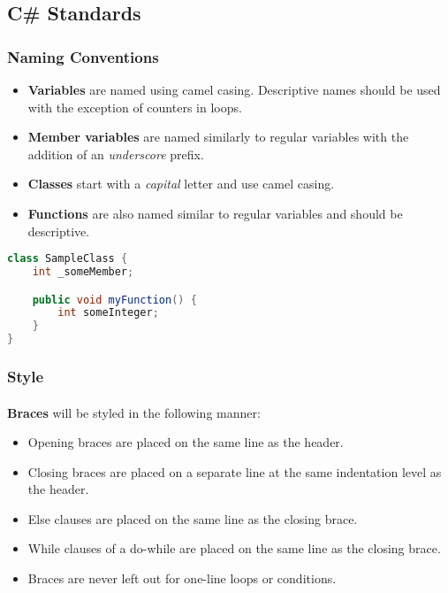 \documentclass{article}
\begin{document}
    \subsection{C\# Standards}
    \label{sec:cs}

    \subsubsection{Naming Conventions}
    \label{sec:cs-nc}

    \begin{itemize}
        \item \textbf{Variables} are named using camel casing. Descriptive names
                should be used with the exception of counters in loops.
        \item \textbf{Member variables} are named similarly to regular variables
                with the addition of an \textit{underscore} prefix.
        \item \textbf{Classes} start with a \textit{capital} letter and use
                camel casing.
        \item \textbf{Functions} are also named similar to regular variables and
                should be descriptive.
    \end{itemize}

    \begin{lstlisting}[language=java]
class SampleClass {
    int _someMember;

    public void myFunction() {
        int someInteger;
    }
}
    \end{lstlisting}

    \subsubsection{Style}
    \label{sec:cs-st}

    \paragraph{}
    \textbf{Braces} will be styled in the following manner:
    \begin{itemize}
        \item Opening braces are placed on the same line as the header.
        \item Closing braces are placed on a separate line at the same
                indentation level as the header.
        \item Else clauses are placed on the same line as the closing brace.
        \item While clauses of a do-while are placed on the same line as the
                closing brace.
        \item Braces are never left out for one-line loops or conditions.
    \end{itemize}
\end{document}
